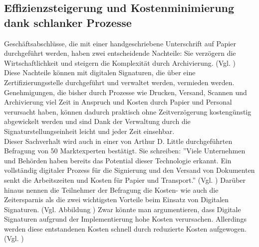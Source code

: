 \documentclass[deutsch]{lib/llncs/llncs}
\begin{document}
\subsection{Effizienzsteigerung und Kostenminimierung dank schlanker Prozesse}
Geschäftsabschlüsse, die mit einer handgeschriebene Unterschrift auf Papier durchgeführt werden, haben zwei entscheidende Nachteile: Sie verzögern die Wirtschaftlichkeit und steigern die Komplexität durch Archivierung. (Vgl. \cite[S. 3]{Zitat05})\\
Diese Nachteile können mit digitalen Signaturen, die über eine Zertifizierungsstelle durchgeführt und verwaltet werden, vermieden werden. Genehmigungen, die bisher durch Prozesse wie Drucken, Versand, Scannen und Archivierung viel Zeit in Anspruch und Kosten durch Papier und Personal verursacht haben, können dadurch praktisch ohne Zeitverzögerung kostengünstig abgewickelt werden und sind Dank der Verwaltung durch die Signaturstellungseinheit leicht und jeder Zeit einsehbar. \\
Dieser Sachverhalt wird auch in einer von Arthur D. Little durchgeführten Befragung von 50 Marktexperten bestätigt. Sie schreiben: ''Viele Unternehmen und Behörden haben bereits das Potential dieser Technologie erkannt. Ein vollständig digitaler Prozess für die Signierung und den Versand von Dokumenten senkt die Arbeitszeiten und Kosten für Papier und Transport.'' (Vgl. \cite[S. 7]{Zitat05})
Darüber hinaus nennen die Teilnehmer der Befragung die Kosten- wie auch die Zeitersparnis als die zwei wichtigsten Vorteile beim Einsatz von Digitalen Signaturen. (Vgl. Abbildung \cite[S. 7]{Zitat05})
Zwar könnte man argumentieren, dass Digitale Signaturen aufgrund der Implementierung hohe Kosten verursachen. Allerdings werden diese entstandenen Kosten schnell durch reduzierte Kosten aufgewogen. (Vgl. \cite[S. 7]{Zitat05})
\end{document}
